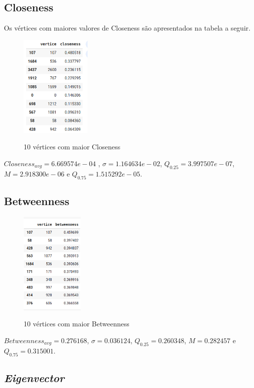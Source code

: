 \documentclass{article}
\begin{document}
\subsection{Closeness}
Os vértices com maiores valores de Closeness são apresentados na tabela a seguir. 
\begin{figure}[h!]
	\centering
	\caption{10 vértices com maior Closeness}
	\includegraphics[height=5cm]{img/maioresCloseness}
	\label{fig:closeness}
\end{figure}


$Closeness_{avg} =   6.669574e-04$ , $\sigma = 1.164634e-02$, $ Q_{0.25} =  3.997507e-07$, $M =  2.918300e-06$ e $Q_{0.75} = 1.515292e-05$. 

\newpage 
\subsection{Betweenness}

\begin{figure}[h!]
	\centering
	\caption{10 vértices com maior Betweenness}
	\includegraphics[height=5cm]{img/betweenness}
	\label{fig:betweenness}
\end{figure}
$Betweenness_{avg} = 0.276168$,  $\sigma = 0.036124$, $Q_{0.25} = 0.260348$, $M = 0.282457$ e $Q_{0.75} = 0.315001$. 


\subsection{\textit{Eigenvector}}
\end{document}
